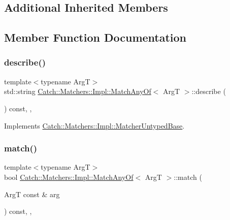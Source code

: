 \subsection*{Additional Inherited Members}


\subsection{Member Function Documentation}
\mbox{\label{struct_catch_1_1_matchers_1_1_impl_1_1_match_any_of_a315285204df93d1f8e72f50dd66eb709}} 
\subsubsection{\texorpdfstring{describe()}{describe()}}
{\footnotesize\ttfamily template$<$typename ArgT$>$ \\
std\+::string \mbox{\hyperlink{struct_catch_1_1_matchers_1_1_impl_1_1_match_any_of}{Catch\+::\+Matchers\+::\+Impl\+::\+Match\+Any\+Of}}$<$ ArgT $>$\+::describe (\begin{DoxyParamCaption}{ }\end{DoxyParamCaption}) const\hspace{0.3cm}{\ttfamily [inline]}, {\ttfamily [override]}, {\ttfamily [virtual]}}



Implements \mbox{\hyperlink{class_catch_1_1_matchers_1_1_impl_1_1_matcher_untyped_base_a91d3a907dbfcbb596077df24f6e11fe2}{Catch\+::\+Matchers\+::\+Impl\+::\+Matcher\+Untyped\+Base}}.

\mbox{\label{struct_catch_1_1_matchers_1_1_impl_1_1_match_any_of_a8a3e8338f979e56277dcf553efb78dc0}} 
\subsubsection{\texorpdfstring{match()}{match()}}
{\footnotesize\ttfamily template$<$typename ArgT$>$ \\
bool \mbox{\hyperlink{struct_catch_1_1_matchers_1_1_impl_1_1_match_any_of}{Catch\+::\+Matchers\+::\+Impl\+::\+Match\+Any\+Of}}$<$ ArgT $>$\+::match (\begin{DoxyParamCaption}\item[{ArgT const \&}]{arg }\end{DoxyParamCaption}) const\hspace{0.3cm}{\ttfamily [inline]}, {\ttfamily [override]}, {\ttfamily [virtual]}}



